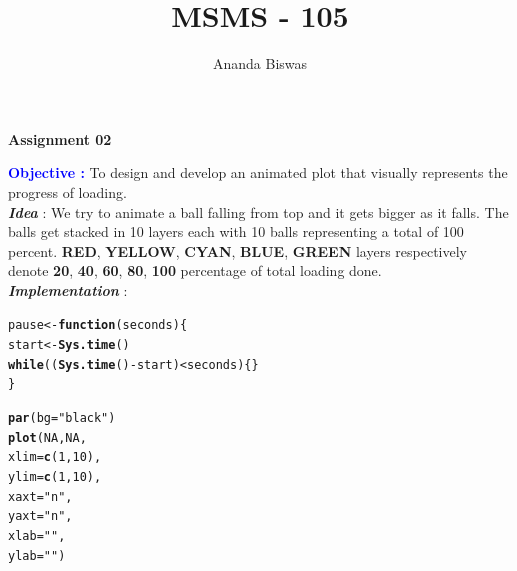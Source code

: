 \documentclass[11pt, a4paper]{article}\usepackage[]{graphicx}\usepackage[]{xcolor}
\title{MSMS - 105}
\author{Ananda Biswas}
\date{}
\makeatletter
\newcommand{\hlnum}[1]{\textcolor[rgb]{0.686,0.059,0.569}{#1}}%
\newcommand{\hlsng}[1]{\textcolor[rgb]{0.192,0.494,0.8}{#1}}%
\newcommand{\hlopt}[1]{\textcolor[rgb]{0,0,0}{#1}}%
\newcommand{\hldef}[1]{\textcolor[rgb]{0.345,0.345,0.345}{#1}}%
\newcommand{\hlkwa}[1]{\textcolor[rgb]{0.161,0.373,0.58}{\textbf{#1}}}%
\newcommand{\hlkwb}[1]{\textcolor[rgb]{0.69,0.353,0.396}{#1}}%
\newcommand{\hlkwc}[1]{\textcolor[rgb]{0.333,0.667,0.333}{#1}}%
\newcommand{\hlkwd}[1]{\textcolor[rgb]{0.737,0.353,0.396}{\textbf{#1}}}%
\newenvironment{kframe}{%
 \def\at@end@of@kframe{}%
 \ifinner\ifhmode%
  \def\at@end@of@kframe{\end{minipage}}%
  \begin{minipage}{\columnwidth}%
 \fi\fi%
 \def\FrameCommand##1{\hskip\@totalleftmargin \hskip-\fboxsep
 \colorbox{shadecolor}{##1}\hskip-\fboxsep
     \hskip-\linewidth \hskip-\@totalleftmargin \hskip\columnwidth}%
 \MakeFramed {\advance\hsize-\width
   \@totalleftmargin\z@ \linewidth\hsize
   \@setminipage}}%
 {\par\unskip\endMakeFramed%
 \at@end@of@kframe}
\newenvironment{knitrout}{}{} %
\makeatother
\begin{document}
\maketitle

\begin{center}
\textbf{Assignment 02}
\end{center}


\OrnamentDiamondSolid \hspace{0.5cm} \textcolor{blue}{\textbf{Objective :}} To design and develop an animated plot that visually represents the progress of loading. \\

\faArrowAltCircleRight[regular] \textcolor{col1}{\textbf{\textit{Idea}}} : We try to animate a ball falling from top and it gets bigger as it falls. The balls get stacked in 10 layers each with 10 balls representing a total of 100 percent. \textcolor{stack_red}{\textbf{RED}}, \textcolor{stack_yellow}{\textbf{YELLOW}}, \textcolor{stack_cyan}{\textbf{CYAN}}, \textcolor{stack_blue}{\textbf{BLUE}}, \textcolor{stack_green}{\textbf{GREEN}} layers respectively denote \textcolor{stack_red}{\textbf{20}}, \textcolor{stack_yellow}{\textbf{40}}, \textcolor{stack_cyan}{\textbf{60}}, \textcolor{stack_blue}{\textbf{80}}, \textcolor{stack_green}{\textbf{100}} percentage of total loading done. \\


\faArrowAltCircleRight[regular] \textcolor{col1}{\textbf{\textit{Implementation}}} : 

\begin{knitrout}
\color{fgcolor}\begin{kframe}
\begin{alltt}
\hldef{pause} \hlkwb{<-} \hlkwa{function}\hldef{(}\hlkwc{seconds}\hldef{) \{}
  \hldef{start} \hlkwb{<-} \hlkwd{Sys.time}\hldef{()}
  \hlkwa{while}\hldef{((}\hlkwd{Sys.time}\hldef{()} \hlopt{-} \hldef{start)} \hlopt{<} \hldef{seconds) \{\}}
\hldef{\}}
\end{alltt}
\end{kframe}
\end{knitrout}

\begin{knitrout}
\color{fgcolor}\begin{kframe}
\begin{alltt}
\hlkwd{par}\hldef{(}\hlkwc{bg} \hldef{=} \hlsng{"black"}\hldef{)}
\hlkwd{plot}\hldef{(}\hlnum{NA}\hldef{,} \hlnum{NA}\hldef{,}
     \hlkwc{xlim} \hldef{=} \hlkwd{c}\hldef{(}\hlnum{1}\hldef{,} \hlnum{10}\hldef{),}
     \hlkwc{ylim} \hldef{=} \hlkwd{c}\hldef{(}\hlnum{1}\hldef{,} \hlnum{10}\hldef{),}
     \hlkwc{xaxt} \hldef{=} \hlsng{"n"}\hldef{,}
     \hlkwc{yaxt} \hldef{=} \hlsng{"n"}\hldef{,}
     \hlkwc{xlab} \hldef{=} \hlsng{""}\hldef{,}
     \hlkwc{ylab} \hldef{=} \hlsng{""}\hldef{)}
\end{alltt}
\end{kframe}
\end{knitrout}
\end{document}
